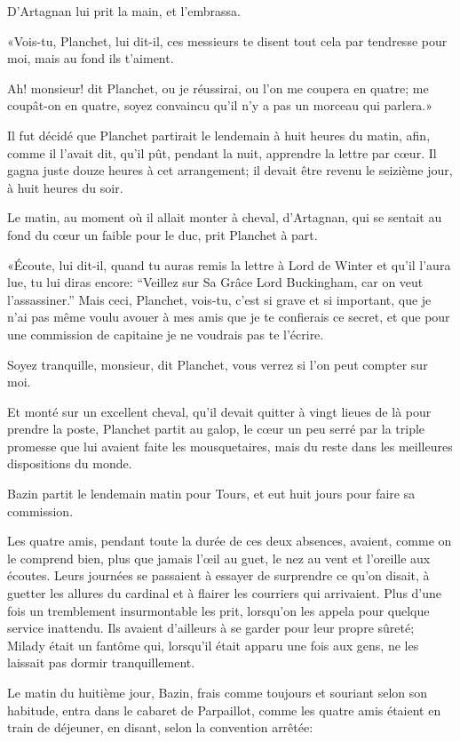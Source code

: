 D'Artagnan lui prit la main, et l'embrassa. 

«Vois-tu, Planchet, lui dit-il, ces messieurs te disent tout cela par tendresse pour moi, mais au fond ils t'aiment. 

\speak  Ah! monsieur! dit Planchet, ou je réussirai, ou l'on me coupera en quatre; me coupât-on en quatre, soyez convaincu qu'il n'y a pas un morceau qui parlera.» 

Il fut décidé que Planchet partirait le lendemain à huit heures du matin, afin, comme il l'avait dit, qu'il pût, pendant la nuit, apprendre la lettre par cœur. Il gagna juste douze heures à cet arrangement; il devait être revenu le seizième jour, à huit heures du soir. 

Le matin, au moment où il allait monter à cheval, d'Artagnan, qui se sentait au fond du cœur un faible pour le duc, prit Planchet à part. 

«Écoute, lui dit-il, quand tu auras remis la lettre à Lord de Winter et qu'il l'aura lue, tu lui diras encore: “Veillez sur Sa Grâce Lord Buckingham, car on veut l'assassiner.” Mais ceci, Planchet, vois-tu, c'est si grave et si important, que je n'ai pas même voulu avouer à mes amis que je te confierais ce secret, et que pour une commission de capitaine je ne voudrais pas te l'écrire. 

\speak  Soyez tranquille, monsieur, dit Planchet, vous verrez si l'on peut compter sur moi. 

Et monté sur un excellent cheval, qu'il devait quitter à vingt lieues de là pour prendre la poste, Planchet partit au galop, le cœur un peu serré par la triple promesse que lui avaient faite les mousquetaires, mais du reste dans les meilleures dispositions du monde. 

Bazin partit le lendemain matin pour Tours, et eut huit jours pour faire sa commission. 

Les quatre amis, pendant toute la durée de ces deux absences, avaient, comme on le comprend bien, plus que jamais l'œil au guet, le nez au vent et l'oreille aux écoutes. Leurs journées se passaient à essayer de surprendre ce qu'on disait, à guetter les allures du cardinal et à flairer les courriers qui arrivaient. Plus d'une fois un tremblement insurmontable les prit, lorsqu'on les appela pour quelque service inattendu. Ils avaient d'ailleurs à se garder pour leur propre sûreté; Milady était un fantôme qui, lorsqu'il était apparu une fois aux gens, ne les laissait pas dormir tranquillement. 

Le matin du huitième jour, Bazin, frais comme toujours et souriant selon son habitude, entra dans le cabaret de Parpaillot, comme les quatre amis étaient en train de déjeuner, en disant, selon la convention arrêtée: 

